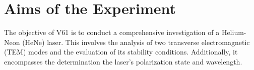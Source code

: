 \section{Aims of the Experiment}
The objective of V61 is to conduct a comprehensive investigation
of a Helium-Neon (HeNe) laser. This involves the analysis of two 
transverse electromagnetic (TEM) modes and the evaluation of its 
stability conditions. Additionally, it encompasses the determination
the laser's polarization state and wavelength.
